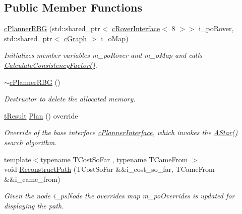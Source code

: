 \subsection*{Public Member Functions}
\begin{DoxyCompactItemize}
\item 
\mbox{\hyperlink{classplanner_1_1c_planner_r_b_g_a91296b98e64effc16f38e2430746d94d}{c\+Planner\+R\+BG}} (std\+::shared\+\_\+ptr$<$ \mbox{\hyperlink{classplanner_1_1c_rover_interface}{c\+Rover\+Interface}}$<$ 8 $>$$>$ i\+\_\+po\+Rover, std\+::shared\+\_\+ptr$<$ \mbox{\hyperlink{classplanner_1_1c_graph}{c\+Graph}} $>$ i\+\_\+o\+Map)
\begin{DoxyCompactList}\small\item\em Initializes member variables m\+\_\+po\+Rover and m\+\_\+o\+Map and calls \mbox{\hyperlink{classplanner_1_1c_planner_a2e5a745f83f903662eff914d8beddb5e}{Calculate\+Consistency\+Factor()}}. \end{DoxyCompactList}\item 
\mbox{\label{classplanner_1_1c_planner_r_b_g_ad582fdf21ae0d86a23e9c25546b66f0e}} 
\mbox{\hyperlink{classplanner_1_1c_planner_r_b_g_ad582fdf21ae0d86a23e9c25546b66f0e}{$\sim$c\+Planner\+R\+BG}} ()
\begin{DoxyCompactList}\small\item\em Destructor to delete the allocated memory. \end{DoxyCompactList}\item 
\mbox{\hyperlink{structt_result}{t\+Result}} \mbox{\hyperlink{classplanner_1_1c_planner_r_b_g_a0bbd752702da582a47dbd153c0065eb5}{Plan}} () override
\begin{DoxyCompactList}\small\item\em Override of the base interface \mbox{\hyperlink{classplanner_1_1c_planner_interface}{c\+Planner\+Interface}}, which invokes the \mbox{\hyperlink{classplanner_1_1c_planner_r_b_g_affd7011ef4df878a8e95ecf7f42c8e6f}{A\+Star()}} search algorithm. \end{DoxyCompactList}\item 
{\footnotesize template$<$typename T\+Cost\+So\+Far , typename T\+Came\+From $>$ }\\void \mbox{\hyperlink{classplanner_1_1c_planner_r_b_g_a1af74d398b286f1e05e6ade495efbbd0}{Reconstruct\+Path}} (T\+Cost\+So\+Far \&\&i\+\_\+cost\+\_\+so\+\_\+far, T\+Came\+From \&\&i\+\_\+came\+\_\+from)
\begin{DoxyCompactList}\small\item\em Given the node i\+\_\+ps\+Node the overrides map m\+\_\+po\+Overrides is updated for displaying the path. \end{DoxyCompactList}\end{DoxyCompactItemize}
